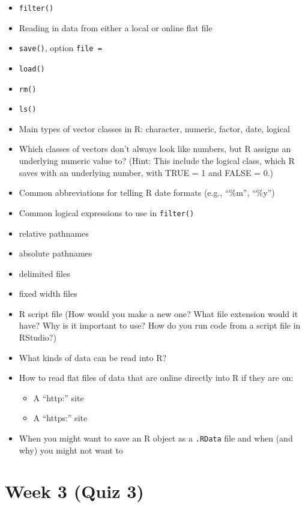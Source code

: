 \documentclass[]{book}
\providecommand{\tightlist}{%
  \setlength{\itemsep}{0pt}\setlength{\parskip}{0pt}}
\begin{document}
\begin{itemize}
\item
  \texttt{filter()}
\item
  Reading in data from either a local or online flat file
\item
  \texttt{save()}, option \texttt{file\ =}
\item
  \texttt{load()}
\item
  \texttt{rm()}
\item
  \texttt{ls()}
\item
  Main types of vector classes in R: character, numeric, factor, date,
  logical
\item
  Which classes of vectors don't always look like numbers, but R assigns
  an underlying numeric value to? (Hint: This include the logical class,
  which R saves with an underlying number, with TRUE = 1 and FALSE = 0.)
\item
  Common abbreviations for telling R date formats (e.g., ``\%m'',
  ``\%y'')
\item
  Common logical expressions to use in \texttt{filter()}
\item
  relative pathnames
\item
  absolute pathnames
\item
  delimited files
\item
  fixed width files
\item
  R script file (How would you make a new one? What file extension would
  it have? Why is it important to use? How do you run code from a script
  file in RStudio?)
\item
  What kinds of data can be read into R?
\item
  How to read flat files of data that are online directly into R if they
  are on:

  \begin{itemize}
  \tightlist
  \item
    A ``http:'' site
  \item
    A ``https:'' site
  \end{itemize}
\item
  When you might want to save an R object as a \texttt{.RData} file and
  when (and why) you might not want to
\end{itemize}

\section{Week 3 (Quiz 3)}\label{week-3-quiz-3}
\end{document}
